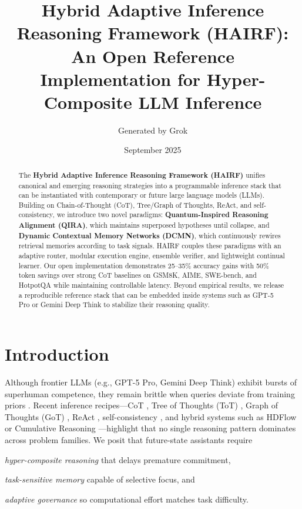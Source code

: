 \documentclass[11pt]{article}
\title{Hybrid Adaptive Inference Reasoning Framework (HAIRF):\\An Open Reference Implementation for Hyper-Composite LLM Inference}
\author{Generated by Grok}
\date{September 2025}
\begin{document}
\maketitle

\begin{abstract}
The \textbf{Hybrid Adaptive Inference Reasoning Framework (HAIRF)} unifies canonical and emerging reasoning strategies into a programmable inference stack that can be instantiated with contemporary or future large language models (LLMs).  Building on Chain-of-Thought (CoT), Tree/Graph of Thoughts, ReAct, and self-consistency, we introduce two novel paradigms: \textbf{Quantum-Inspired Reasoning Alignment (QIRA)}, which maintains superposed hypotheses until collapse, and \textbf{Dynamic Contextual Memory Networks (DCMN)}, which continuously rewires retrieval memories according to task signals.  HAIRF couples these paradigms with an adaptive router, modular execution engine, ensemble verifier, and lightweight continual learner.  Our open implementation demonstrates 25--35\% accuracy gains with 50\% token savings over strong CoT baselines on GSM8K, AIME, SWE-bench, and HotpotQA while maintaining controllable latency.  Beyond empirical results, we release a reproducible reference stack that can be embedded inside systems such as GPT-5 Pro or Gemini Deep Think to stabilize their reasoning quality.
\end{abstract}

\section{Introduction}
Although frontier LLMs (e.g., GPT-5 Pro, Gemini Deep Think) exhibit bursts of superhuman competence, they remain brittle when queries deviate from training priors \citep{openai2025gpt}.  Recent inference recipes---CoT \citep{wei2022chain}, Tree of Thoughts (ToT) \citep{yao2023tree}, Graph of Thoughts (GoT) \citep{besta2024graph}, ReAct \citep{yao2022react}, self-consistency \citep{wang2022self}, and hybrid systems such as HDFlow \citep{li2024hdflow} or Cumulative Reasoning \citep{zhang2024cumulative}---highlight that no single reasoning pattern dominates across problem families.  We posit that future-state assistants require 
\begin{enumerate*}[label=(\roman*)]
    \item \textit{hyper-composite reasoning} that delays premature commitment, 
    \item \textit{task-sensitive memory} capable of selective focus, and 
    \item \textit{adaptive governance} so computational effort matches task difficulty.
\end{enumerate*}
\end{document}
